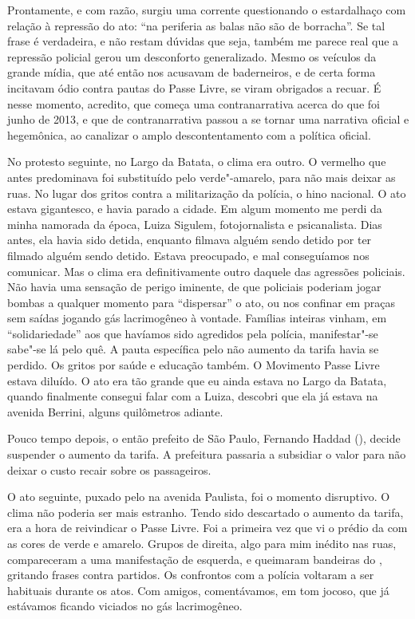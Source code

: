 Prontamente, e com razão, surgiu uma corrente questionando o estardalhaço com relação à repressão do ato: ``na periferia as balas não são de borracha''. Se tal frase é verdadeira, e não restam dúvidas que seja, também me parece real que a repressão policial gerou um desconforto generalizado. Mesmo os veículos da grande mídia, que até então nos
acusavam de baderneiros, e de certa forma incitavam ódio contra pautas
do Passe Livre, se viram obrigados a recuar. É nesse momento,
acredito, que começa uma contranarrativa acerca do que foi junho de
2013, e que de contranarrativa passou a se tornar uma narrativa oficial
e hegemônica, ao canalizar o amplo descontentamento com a política
oficial.

No protesto seguinte, no Largo da Batata, o clima era outro. O vermelho
que antes predominava foi substituído pelo verde"-amarelo, para não mais deixar as ruas. No lugar dos
gritos contra a militarização da polícia, o hino nacional. O ato estava
gigantesco, e havia parado a cidade. Em algum momento me perdi da minha
namorada da época, Luiza Sigulem, fotojornalista e psicanalista. Dias antes, ela havia sido
detida, enquanto filmava alguém sendo detido por ter filmado alguém
sendo detido. Estava preocupado, e mal conseguíamos nos comunicar. Mas o
clima era definitivamente outro daquele das agressões policiais. Não
havia uma sensação de perigo iminente, de que policiais poderiam jogar
bombas a qualquer momento para ``dispersar'' o ato, ou nos confinar em
praças sem saídas jogando gás lacrimogêneo à vontade. Famílias inteiras vinham, em
``solidariedade'' aos que havíamos sido agredidos pela polícia,
manifestar"-se sabe"-se lá pelo quê. A pauta específica pelo não aumento da
tarifa havia se perdido. Os gritos por saúde e educação também. O
Movimento Passe Livre estava diluído. O ato era tão grande que
eu ainda estava no Largo da Batata, quando finalmente consegui falar com
a Luiza, descobri que ela já estava na avenida Berrini, alguns
quilômetros adiante.

Pouco tempo depois, o então prefeito de São Paulo, Fernando Haddad (),
decide suspender o aumento da tarifa. A prefeitura passaria a subsidiar
o valor para não deixar o custo recair sobre os passageiros.

O ato seguinte, puxado pelo  na avenida Paulista, foi o momento disruptivo. O clima não
poderia ser mais estranho. Tendo sido descartado o aumento da tarifa,
era a hora de reivindicar o Passe Livre. Foi a primeira vez que vi o
prédio da  com as cores de verde e amarelo. Grupos de direita, algo
para mim inédito nas ruas, compareceram a uma manifestação de esquerda, e
queimaram bandeiras do , gritando frases contra partidos. Os
confrontos com a polícia voltaram a ser habituais durante os atos. Com
amigos, comentávamos, em tom jocoso, que já estávamos ficando viciados no gás
lacrimogêneo.

